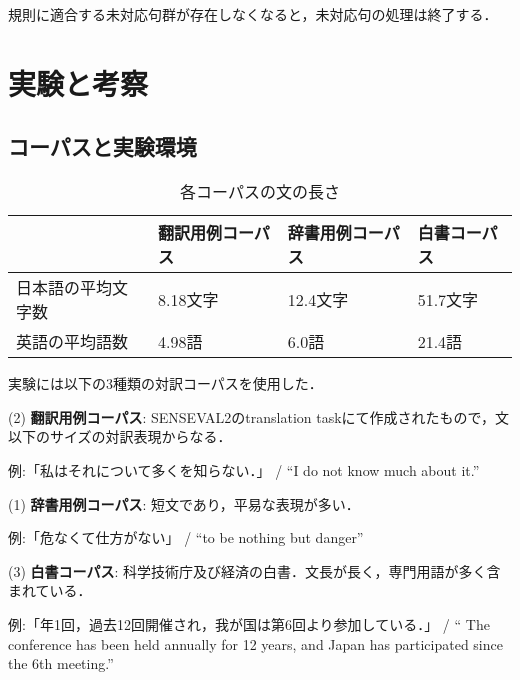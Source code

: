 規則に適合する未対応句群が存在しなくなると，未対応句の処理は終了する．



\section{実験と考察}

\subsection{コーパスと実験環境}


\begin{table}
\begin{center}
\begin{tabular}{llll}
\hline
				&翻訳用例コーパス	&辞書用例コーパス		&	白書コーパス	\\
\hline                                                  
	日本語の平均文字数	&8.18文字		&12.4文字			&	51.7文字	\\
	英語の平均語数		&4.98語			&6.0語				&	21.4語		\\
\hline

\end{tabular}
\caption{各コーパスの文の長さ}
\label{文長}
\end{center}
\end{table}

実験には以下の3種類の対訳コーパスを使用した．

\vspace{1ex}
\begin{description}

\item (2) {\bf 翻訳用例コーパス}: SENSEVAL2のtranslation task\cite{Kurohashi2001}にて作成されたもので，文以下のサイズの対訳表現からなる．
\item 例:「私はそれについて多くを知らない．」 / ``I do not know much about it.''

\vspace{1ex}
\vspace{1ex}

\item (1) {\bf 辞書用例コーパス}: 短文であり，平易な表現が多い．
\item 例:「危なくて仕方がない」 / ``to be nothing but danger''

\vspace{1ex}
\vspace{1ex}

\item (3) {\bf 白書コーパス}: 科学技術庁及び経済の白書．文長が長く，専門用語が多く含まれている．
\item 例:「年1回，過去12回開催され，我が国は第6回より参加している．」 / `` The conference has been held annually for 12 years, and Japan has participated since the 6th meeting.''

\end{description}
\vspace{1ex}
\vspace{1ex}
\vspace{1ex}

